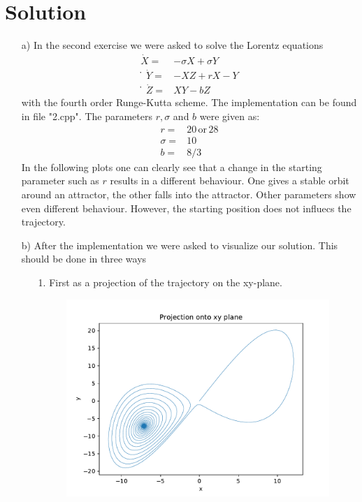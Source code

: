 
\section{Solution}
\label{sec:auswertung}


\begin{itemize}
    \item[a)]
        In the second exercise we were asked to solve the Lorentz equations 
        \begin{align*}
            \dot{X} = & -\sigma X + \sigma Y \\
 ̇           \dot{Y} = & -XZ + rX - Y \\
 ̇           \dot{Z} = & XY - bZ
        \end{align*}
        with the fourth order Runge-Kutta scheme.
        The implementation can be found in file "2.cpp".
        The parameters $r, \sigma$ and $b$ were given as:
        \begin{align*}
            r = & 20 \,\text{or}\, 28\\
            \sigma = & 10 \\
            b = & 8/3
        \end{align*}
        In the following plots one can clearly see that a change in the starting parameter such as $r$ results in a different behaviour.
        One gives a stable orbit around an attractor, the other falls into the attractor.
        Other parameters show even different behaviour.
        However, the starting position does not influecs the trajectory.
    \item[b)]
        After the implementation we were asked to visualize our solution.
        This should be done in three ways
        \begin{itemize}
            \item[1.]
                First as a projection of the trajectory on the xy-plane.
                \FloatBarrier
                \begin{figure}
                    \includegraphics[width=\textwidth]{images/Lorentz_r_20_projection.pdf}

\end{figure}
\end{itemize}
\end{itemize}
